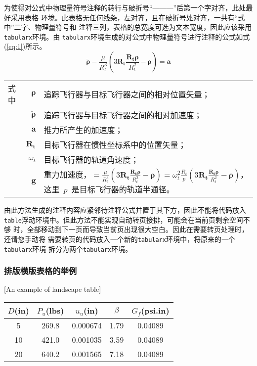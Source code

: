 为使得对公式中物理量符号注释的转行与破折号“———”后第一个字对齐，此处最好采用表格
环境。此表格无任何线条，左对齐，且在破折号处对齐，一共有“式中”二字、物理量符号和
注释三列，表格的总宽度可选为文本宽度，因此应该采用\verb|tabularx|环境。由
\verb|tabularx|环境生成的对公式中物理量符号进行注释的公式如式(\ref{eq:1})所示。
\begin{equation}\label{eq:1}
\ddot{\boldsymbol{\rho}}-\frac{\mu}{R_{t}^{3}}\left(3\mathbf{R_{t}}\frac{\mathbf{R_{t}\rho}}{R_{t}^{2}}-\boldsymbol{\rho}\right)=\mathbf{a}
\end{equation}
\begin{tabularx}{\textwidth}{@{}l@{\quad}r@{———}X@{}}
式中& $\boldsymbol{\rho}$ &追踪飞行器与目标飞行器之间的相对位置矢量；\\
&  $\boldsymbol{\ddot{\rho}}$&追踪飞行器与目标飞行器之间的相对加速度；\\
&  $\mathbf{a}$   &推力所产生的加速度；\\
&  $\mathbf{R_t}$ & 目标飞行器在惯性坐标系中的位置矢量；\\
&  $\omega_{t}$ & 目标飞行器的轨道角速度；\\
&  $\mathbf{g}$ & 重力加速度，$=\frac{\mu}{R_{t}^{3}}\left(
3\mathbf{R_{t}}\frac{\mathbf{R_{t}\rho}}{R_{t}^{2}}-\boldsymbol{\rho}\right)=\omega_{t}^{2}\frac{R_{t}}{p}\left(
3\mathbf{R_{t}}\frac{\mathbf{R_{t}\rho}}{R_{t}^{2}}-\boldsymbol{\rho}\right)$，这里~$p$~是目标飞行器的轨道半通径。
\end{tabularx}\vspace{3.15bp}
由此方法生成的注释内容应紧邻待注释公式并置于其下方，因此不能将代码放入
\verb|table|浮动环境中。但此方法不能实现自动转页接排，可能会在当前页剩余空间不够
时，全部移动到下一页而导致当前页出现很大空白。因此在需要转页处理时，还请您手动将
需要转页的代码放入一个新的\verb|tabularx|环境中，将原来的一个\verb|tabularx|环境
拆分为两个\verb|tabularx|环境。

\subsubsection{排版横版表格的举例}[An example of landscape table]

\begin{table}[p]
\centering
\begin{sideways}
\begin{minipage}{\textheight}
\vspace{0.5em}\centering\wuhao
\begin{tabular}{ccccc}
\toprule
$D$(in) & $P_u$(lbs) & $u_u$(in) & $\beta$ & $G_f$(psi.in)\\
\midrule
 5 & 269.8 & 0.000674 & 1.79 & 0.04089\\
10 & 421.0 & 0.001035 & 3.59 & 0.04089\\
20 & 640.2 & 0.001565 & 7.18 & 0.04089\\
\bottomrule
\end{tabular}
\end{minipage}
\end{sideways}
\end{table}


